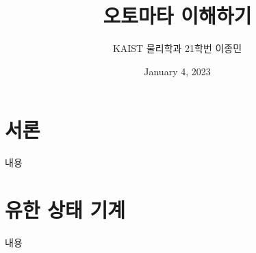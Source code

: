 \documentclass[11pt]{book}
\title{오토마타 이해하기}
\author{KAIST 물리학과 21학번 이종민}
\date{January 4, 2023}
\begin{document}
\section*{서론}
\begin{MLPar}
내용
\end{MLPar}

\section{유한 상태 기계}
\begin{MLPar}
내용
\end{MLPar}
\end{document}
